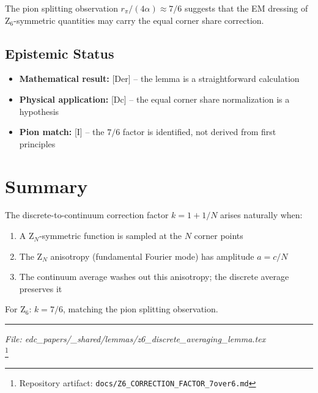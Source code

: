 \documentclass[11pt]{article}
\begin{document}
The pion splitting observation $r_\pi/(4\alpha) \approx 7/6$ suggests that the EM dressing of Z$_6$-symmetric quantities may carry the equal corner share correction.

\subsection{Epistemic Status}

\begin{itemize}
\item \textbf{Mathematical result:} [Der] -- the lemma is a straightforward calculation
\item \textbf{Physical application:} [Dc] -- the equal corner share normalization is a hypothesis
\item \textbf{Pion match:} [I] -- the $7/6$ factor is identified, not derived from first principles
\end{itemize}

\section{Summary}

The discrete-to-continuum correction factor $k = 1 + 1/N$ arises naturally when:
\begin{enumerate}
\item A Z$_N$-symmetric function is sampled at the $N$ corner points
\item The Z$_N$ anisotropy (fundamental Fourier mode) has amplitude $a = c/N$
\item The continuum average washes out this anisotropy; the discrete average preserves it
\end{enumerate}

For Z$_6$: $k = 7/6$, matching the pion splitting observation.

\vspace{1em}
\hrule
\vspace{0.5em}
\textit{File: edc\_papers/\_shared/lemmas/z6\_discrete\_averaging\_lemma.tex} \\
\footnote{Repository artifact: \texttt{docs/Z6\_CORRECTION\_FACTOR\_7over6.md}}
\end{document}
